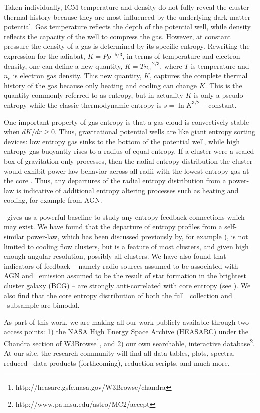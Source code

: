 \documentclass{emulateapj}
\begin{document}
Taken individually, ICM temperature and density do not fully reveal
the cluster thermal history because they are most influenced by the
underlying dark matter potential. Gas temperature reflects the depth
of the potential well, while density reflects the capacity of the well
to compress the gas. However, at constant pressure the density of a
gas is determined by its specific entropy. Rewriting the expression
for the adiabat, $K=P\rho^{-5/3}$, in terms of temperature and
electron density, one can define a new quantity, $K=T n_e^{-2/3}$,
where $T$ is temperature and $n_e$ is electron gas density. This new
quantity, $K$, captures the complete thermal history of the gas
because only heating and cooling can change $K$. This is the quantity
commonly referred to as entropy, but in actuality $K$ is only a
pseudo-entropy while the classic thermodynamic entropy is $s = \ln
K^{3/2} + \mathrm{constant}$.

One important property of gas entropy is that a gas cloud is
convectively stable when $dK/dr \geq 0$. Thus, gravitational potential
wells are like giant entropy sorting devices: low entropy gas sinks to
the bottom of the potential well, while high entropy gas buoyantly
rises to a radius of equal entropy. If a cluster were a sealed box of
gravitation-only processes, then the radial entropy distribution the
cluster would exhibit power-law behavior across all radii with the
lowest entropy gas at the core \citep{vkb05}. Thus, any departures of
the radial entropy distribution from a power-law is indicative of
additional entropy altering processes such as heating and cooling, for
example from AGN.

\accept\ gives us a powerful baseline to study any entropy-feedback
connections which may exist. We have found that the departure of
entropy profiles from a self-similar power-law, which has been
discussed previously by, for example \cite{piffaretti05, radioquiet,
d06, morandi07}), is not limited to cooling flow clusters, but is a
feature of most clusters, and given high enough angular resolution,
possibly all clusters. We have also found that indicators of feedback
-- namely radio sources assumed to be associated with AGN and
\halpha\ emission assumed to be the result of star formation in the
brightest cluster galaxy (BCG) -- are strongly anti-correlated with
core entropy (see \citealt{haradent}). We also find that the core
entropy distribution of both the full \accept\ collection and \hifl\
subsample are bimodal.

As part of this work, we are making all our work publicly available
through two access points: 1) the NASA High Energy Space Archive
(HEASARC) under the Chandra section of
W3Browse\footnote{http://heasarc.gsfc.nasa.gov/W3Browse/chandra}, and
2) our own searchable, interactive
database\footnote{http://www.pa.msu.edu/astro/MC2/accept}. At our
site, the research community will find all data tables, plots,
spectra, reduced \chandra\ data products (forthcoming), reduction
scripts, and much more.
\end{document}
